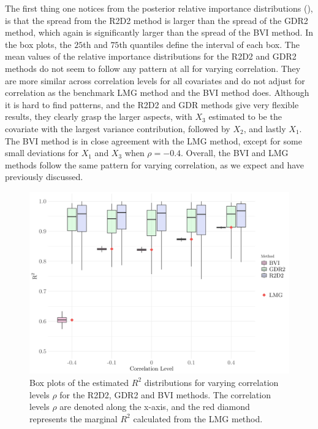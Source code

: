 \noindent The first thing one notices from the posterior relative importance distributions (), is that the spread from the R2D2 method is larger than the spread of the GDR2 method, which again is significantly larger than the spread of the BVI method. In the box plots, the $25$th and $75$th quantiles define the interval of each box. The mean values of the relative importance distributions for the R2D2 and GDR2 methods do not seem to follow any pattern at all for varying correlation. They are more similar across correlation levels for all covariates and do not adjust for correlation as the benchmark LMG method and the BVI method does. Although it is hard to find patterns, and the R2D2 and GDR methods give very flexible results, they clearly grasp the larger aspects, with $X_3$ estimated to be the covariate with the largest variance contribution, followed by $X_2$, and lastly $X_1$. The BVI method is in close agreement with the LMG method, except for some small deviations for $X_1$ and $X_3$ when $\rho=-0.4$. Overall, the BVI and LMG methods follow the same pattern for varying correlation, as we expect and have previously discussed.
\begin{figure}[H]%
  \centering
  \includegraphics[width=1\linewidth]{Figures/R2D2_BVI_Comparison/R2D2_BVI_R2_plot.png}
  \caption[Comparison of the marginal $R^2$ from the BVI method and the shrinkage prior methods]{Box plots of the estimated $R^2$ distributions for varying correlation levels $\rho$ for the R2D2, GDR2 and BVI methods. The correlation levels $\rho$ are denoted along the x-axis, and the red diamond represents the marginal $R^2$ calculated from the LMG method.}
  \label{fig:r2d2_r2}
\end{figure}
